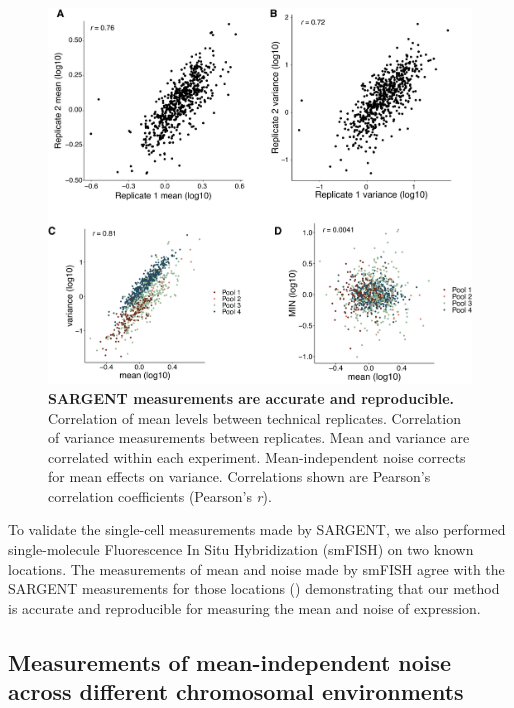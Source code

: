 \begin{figure}[t!]  
    \centering
    \includegraphics[width=\linewidth]{figures/cas/cas_figure2.png}
    \caption[SARGENT measurements are accurate and reproducible.]{%
        \textbf{SARGENT measurements are accurate and reproducible.}
        Correlation of mean levels between technical replicates.
        Correlation of variance measurements between replicates.
        Mean and variance are correlated within each experiment.
        Mean-independent noise corrects for mean effects on variance. Correlations shown are Pearson’s correlation coefficients (Pearson’s \textit{r}). 
    }
    \label{fig:cas_figure2}
\end{figure}

To validate the single-cell measurements made by SARGENT, we also performed single-molecule Fluorescence In Situ Hybridization (smFISH) on two known locations. The measurements of mean and noise made by smFISH agree with the SARGENT measurements for those locations () demonstrating that our method is accurate and reproducible for measuring the mean and noise of expression. 

\subsection{Measurements of mean-independent noise across different chromosomal environments}

